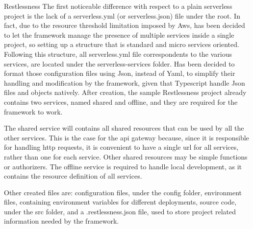 \begin{chapter}{Restlessness}
    The first noticeable difference with respect to a plain serverless project is the
    lack of a serverless.yml (or serverless.json) file under the root.
    In fact, due to the resource threshold limitation imposed by Aws, has been decided
    to let the framework manage the presence of multiple services inside a single
    project, so setting up a structure that is standard and micro services oriented.
    Following this structure, all serverless.yml file correspondents to the various
    services, are located under the serverless-services folder.
    Has been decided to format those configuration files using Json, instead of Yaml,
    to simplify their handling and modification by the framework, given that Typescript
    handle Json files and objects natively.
    After creation, the sample Restlessness project already contains two services,
    named shared and offline, and they are required for the framework to work.

    The shared service will contains all shared resources that can be used by all
    the other services. This is the case for the api gateway because, since it is
    responsible for handling http requests, it is convenient to have a single url
    for all services, rather than one for each service. Other shared resources may
    be simple functions or authorizers.
    The offline service is required to handle local development, as it contains the
    resource definition of all services.

    Other created files are: configuration files, under the config folder, environment
    files, containing environment variables for different deployments, source code,
    under the src folder, and a .restlessness.json file, used to store project related
    information needed by the framework.


\end{chapter}
